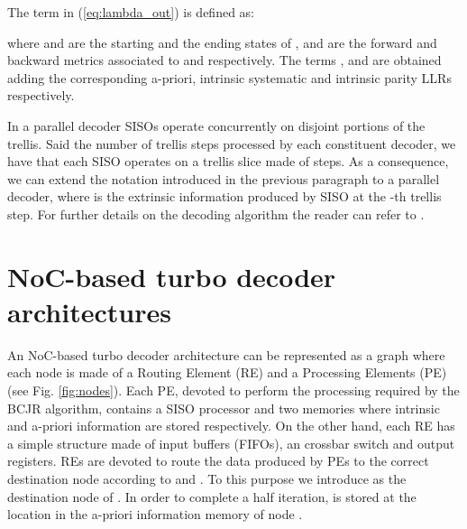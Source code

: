\documentclass[10pt,twocolumn,journal]{IEEEtran}
\begin{document}
The term  in (\ref{eq:lambda_out}) is defined as:




where  and  are the starting and the ending states of 
,  and  are 
the forward and backward metrics associated to 
 and  respectively. 
The terms ,  and  are obtained 
adding the corresponding a-priori, intrinsic systematic and intrinsic parity LLRs respectively. 

In a parallel decoder  SISOs operate concurrently on disjoint portions of 
the trellis. Said  the number of trellis steps processed by each constituent decoder, we have that each SISO  
operates on a trellis slice made of  steps. As a consequence, we can extend the notation introduced in the previous 
paragraph to a parallel decoder, where  is the extrinsic information produced by SISO  at the  
-th trellis step. 
For further details on the decoding algorithm the reader can refer to \cite{montorsi_IEEEProc07}.

\section{NoC-based turbo decoder architectures}
\label{sec:noc}

An NoC-based turbo decoder architecture can be represented as a graph where each node is 
made of a Routing Element (RE) and a Processing Elements (PE) (see Fig. \ref{fig:nodes}).
Each PE, devoted to perform the processing required 
by the BCJR algorithm, contains a SISO processor and two memories where 
intrinsic and a-priori information are stored respectively. On the other hand, each RE has a simple structure made of 
 input buffers (FIFOs), an  crossbar switch and  output registers. 
REs are devoted to route the data produced by PEs to the correct destination node according to  and 
. To this purpose we introduce  as the destination node of . 
In order to complete a half iteration,  is stored at the location  in the 
a-priori information memory of node . 
\end{document}

